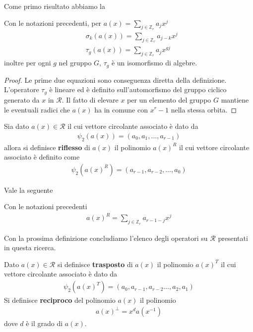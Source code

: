 Come primo risultato abbiamo la
\begin{prop}
   Con le notazioni precedenti, per $a(x) = \sum_{j \in \mathbb{Z}_{r}} a_{j} x^j$
   \begin{align*}
     & \sigma_{k} (a(x)) = \sum_{j \in \mathbb{Z}_{r}} a_{j-k} x^j \\
     & \tau_{g} (a(x)) = \sum_{j \in \mathbb{Z}_{r}} a_{j}x^{gj}
   \end{align*}
   inoltre per ogni $g$ nel gruppo $G$, $\tau_{g}$ è un isomorfismo di algebre.
\end{prop}
\begin{proof}
   Le prime due equazioni sono conseguenza diretta della definizione.
   L'operatore $\tau_{g}$ è lineare ed è definito sull'automorfismo del gruppo ciclico generato da $x$ in $\mathcal{R}$. Il fatto di elevare $x$ per un elemento del gruppo $G$ mantiene le eventuali radici che $a(x)$ ha in comune con $x^r - 1$ nella stessa orbita.
\end{proof}
\begin{definizione}
   Sia dato $a(x) \in \mathcal{R}$ il cui vettore circolante associato è dato da
   \begin{align*}
      \psi_{2}(a(x))=(a_0 , a_1 , \dots, a_{r-1})
   \end{align*}
   allora si definisce {\bf riflesso} di $a(x)$ il polinomio $a(x)^{R}$ il cui vettore circolante associato è definito come
   \begin{align*}
      \psi_{2}(a(x)^{R})=(a_{r-1} , a_{r-2} , \dots, a_{0})
   \end{align*}
\end{definizione}
\noindent
Vale la seguente
\begin{prop}
   Con le notazioni precedenti
   \begin{align*}
     a(x)^{R}  = \sum_{j \in \mathbb{Z}_{r}} a_{r-1-j}x^{j}
   \end{align*}
\end{prop}
\noindent
Con la prossima definizione concludiamo l'elenco degli operatori su $\mathcal{R}$ presentati in questa ricerca.
\begin{definizione}
   Dato $a(x) \in \mathcal{R}$ si definisce {\bf trasposto} di $a(x)$ il polinomio $a(x)^{T}$ il cui vettore circolante associato è dato da
   \begin{align*}
   \psi_{2}(a(x)^{T})=(a_{0} , a_{r-1} , a_{r-2} \dots, a_{2}, a_{1})
   \end{align*}
   Si definisce {\bf reciproco} del polinomio $a(x)$ il polinomio
   \begin{align*}
      a(x)^{\perp} = x^d a(x^{-1})
   \end{align*}
   dove $d$ è il grado di $a(x)$.
\end{definizione}
